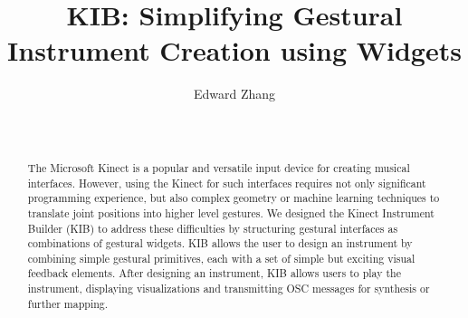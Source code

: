 \documentclass{nime-alternate}
\begin{document}
%

\title{KIB: Simplifying Gestural Instrument Creation using Widgets}

%
%
%
%
%

%
\author{
%
%
\alignauthor Edward Zhang\\
       \\
       \\
}
\maketitle
\begin{abstract}
The Microsoft Kinect is a popular and versatile input device for creating musical interfaces.
However, using the Kinect for such interfaces requires not only significant programming
experience, but also complex geometry or machine learning techniques to translate joint
positions into higher level gestures. We designed the Kinect Instrument Builder (KIB) to
address these difficulties by structuring gestural interfaces as combinations of gestural
widgets. KIB allows the user to design an instrument by combining simple gestural primitives,
each with a set of simple but exciting visual feedback elements. After designing an instrument,
KIB allows users to play the instrument, displaying visualizations and transmitting OSC 
messages for synthesis or further mapping.
\end{abstract}
\end{document}
